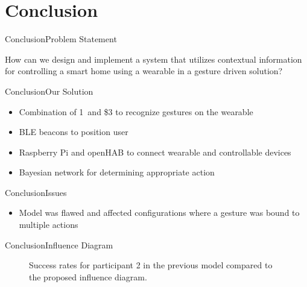 \section{Conclusion}

\begin{frame}{Conclusion}{Problem Statement}

\begin{framed}
\noindent How can we design and implement a system that utilizes contextual information for controlling a smart home using a wearable in a gesture driven solution?
\end{framed}

\end{frame}

\begin{frame}{Conclusion}{Our Solution}

\begin{itemize}
	\item Combination of 1\textcent~and \$3 to recognize gestures on the wearable
	\item BLE beacons to position user
	\item Raspberry Pi and openHAB to connect wearable and controllable devices
	\item Bayesian network for determining appropriate action
\end{itemize}

\end{frame}

\begin{frame}{Conclusion}{Issues}

\begin{itemize}
	\item Model was flawed and affected configurations where a gesture was bound to multiple actions
\end{itemize}

\end{frame}

\begin{frame}{Conclusion}{Influence Diagram}
\begin{figure}[h]
\centering
{}
\caption{Success rates for participant 2 in the previous model compared to the proposed influence diagram.}
\end{figure}

\end{frame}

\begin{frame}
\centering\huge\textbf{}
\end{frame}

